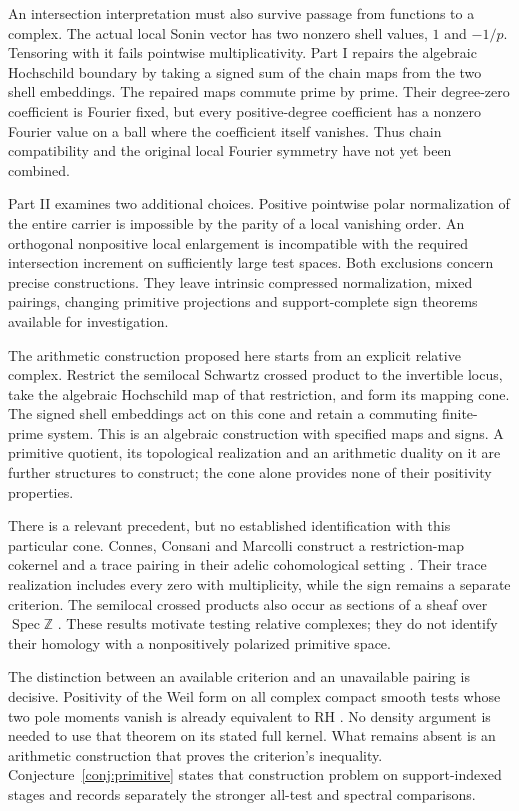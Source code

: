 \documentclass[11pt,letterpaper]{article}
\theoremstyle{definition}
\theoremstyle{remark}
\newcommand{\Z}{\mathbb Z}
\begin{document}
An intersection interpretation must also survive passage from functions
to a complex. The actual local Sonin vector has two nonzero shell values,
$1$ and $-1/p$. Tensoring with it fails pointwise multiplicativity. Part I
\cite{PartI} repairs the algebraic Hochschild boundary by taking a signed
sum of the chain maps from the two shell embeddings. The repaired maps
commute prime by prime. Their degree-zero coefficient is Fourier fixed,
but every positive-degree coefficient has a nonzero Fourier value on a
ball where the coefficient itself vanishes. Thus chain compatibility
and the original local Fourier symmetry have not yet been combined.

Part II \cite{PartII} examines two additional choices. Positive
pointwise polar normalization of the entire carrier is impossible by
the parity of a local vanishing order. An orthogonal nonpositive local
enlargement is incompatible with the required intersection increment
on sufficiently large test spaces. Both exclusions concern precise
constructions. They leave intrinsic compressed normalization, mixed
pairings, changing primitive projections and support-complete sign
theorems available for investigation.

The arithmetic construction proposed here starts from an explicit
relative complex. Restrict the semilocal Schwartz crossed product to
the invertible locus, take the algebraic Hochschild map of that
restriction, and form its mapping cone. The signed shell embeddings
act on this cone and retain a commuting finite-prime system. This is
an algebraic construction with specified maps and signs. A primitive
quotient, its topological realization and an arithmetic duality on it
are further structures to construct; the cone alone provides none of
their positivity properties.

There is a relevant precedent, but no established identification with
this particular cone. Connes, Consani and Marcolli construct a
restriction-map cokernel and a trace pairing in their adelic
cohomological setting \cite[Sections 4.2 to 5]{CCMar}. Their trace
realization includes every zero with multiplicity, while the sign
remains a separate criterion. The semilocal crossed products also occur
as sections of a sheaf over $\operatorname{Spec}\Z$
\cite[Section 7.3, Theorem 7.2]{C26}. These results motivate testing
relative complexes; they do not identify their homology with a
nonpositively polarized primitive space.

The distinction between an available criterion and an unavailable
pairing is decisive. Positivity of the Weil form on all complex
compact smooth tests whose two pole moments vanish is already
equivalent to RH \cite[Appendix C, Proposition 1]{CC20}. No density
argument is needed to use that theorem on its stated full kernel.
What remains absent is an arithmetic construction that proves the
criterion's inequality. Conjecture~\ref{conj:primitive} states that
construction problem on support-indexed stages and records separately
the stronger all-test and spectral comparisons.
\end{document}
